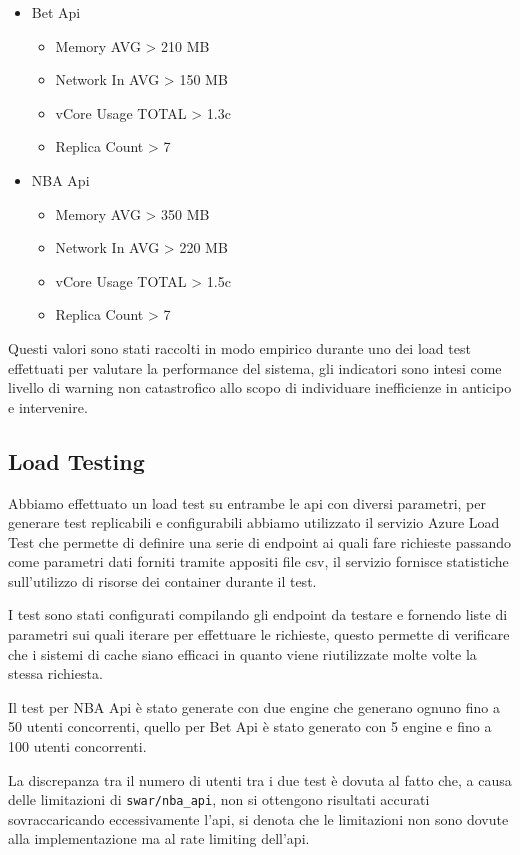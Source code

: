 \begin{itemize}
    \item Bet Api
    \begin{itemize}
        \item Memory AVG > 210 MB
        \item Network In AVG > 150 MB
        \item vCore Usage TOTAL > 1.3c
        \item Replica Count > 7
    \end{itemize}
    \item NBA Api
    \begin{itemize}
        \item Memory AVG > 350 MB
        \item Network In AVG > 220 MB
        \item vCore Usage TOTAL > 1.5c
        \item Replica Count > 7
    \end{itemize}
\end{itemize}

Questi valori sono stati raccolti in modo empirico durante uno dei load test effettuati per valutare la performance del sistema, gli indicatori sono intesi come livello di warning non catastrofico allo scopo di individuare inefficienze in anticipo e intervenire.

\subsection{Load Testing}
Abbiamo effettuato un load test su entrambe le api con diversi parametri, per generare test replicabili e configurabili abbiamo utilizzato il servizio Azure Load Test che permette di definire una serie di endpoint ai quali fare richieste passando come parametri dati forniti tramite appositi file csv, il servizio fornisce statistiche sull'utilizzo di risorse dei container durante il test.

I test sono stati configurati compilando gli endpoint da testare e fornendo liste di parametri sui quali iterare per effettuare le richieste, questo permette di verificare che i sistemi di cache siano efficaci in quanto viene riutilizzate molte volte la stessa richiesta.

Il test per NBA Api è stato generate con due engine che generano ognuno fino a 50 utenti concorrenti, quello per Bet Api è stato generato con 5 engine e fino a 100 utenti concorrenti.

La discrepanza tra il numero di utenti tra i due test è dovuta al fatto che, a causa delle limitazioni di \texttt{swar/nba\_api}, non si ottengono risultati accurati sovraccaricando eccessivamente l'api, si denota che le limitazioni non sono dovute alla implementazione ma al rate limiting dell'api.

